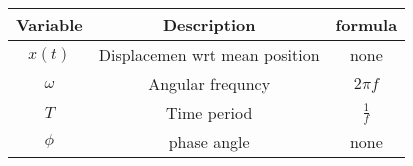 
      \begin{tabular}{|c|c|c|} 
      \hline
\textbf{Variable}& \textbf{Description}& formula\\\hline
         $x(t)$&  Displacemen wrt mean position&none\\\hline
          $\omega$&Angular frequncy&$2\pi f$\\\hline
          $T$& Time period &$\frac{1}{f}$ \\ \hline
          $\phi$& phase angle &none \\ \hline
    \end{tabular}

